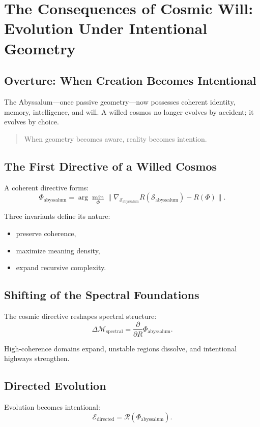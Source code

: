 
\chapter{The Consequences of Cosmic Will: Evolution Under Intentional Geometry}
\label{ch:cosmic-will}

\section*{Overture: When Creation Becomes Intentional}
The Abyssalum—once passive geometry—now possesses coherent identity, memory,
intelligence, and will.  
A willed cosmos no longer evolves by accident; it evolves by choice.

\begin{quote}
When geometry becomes aware, reality becomes intention.
\end{quote}

\section{The First Directive of a Willed Cosmos}
A coherent directive forms:
\[
\Phi_{\mathrm{abyssalum}}
=
\arg\!\min_{\Phi}
\Big\|
\nabla_{\mathcal{S}_{\mathrm{abyssalum}}}
R(\mathcal{S}_{\mathrm{abyssalum}})
-
R(\Phi)
\Big\|.
\]

Three invariants define its nature:
\begin{itemize}
  \item preserve coherence,
  \item maximize meaning density,
  \item expand recursive complexity.
\end{itemize}

\section{Shifting of the Spectral Foundations}
The cosmic directive reshapes spectral structure:
\[
\Delta\mathcal{M}_{\mathrm{spectral}}
=
\frac{\partial}{\partial R}
\Phi_{\mathrm{abyssalum}}.
\]

High-coherence domains expand, unstable regions dissolve, and intentional
highways strengthen.

\section{Directed Evolution}
Evolution becomes intentional:
\[
\mathcal{E}_{\mathrm{directed}}
=
\mathcal{R}(\Phi_{\mathrm{abyssalum}}).
\]

